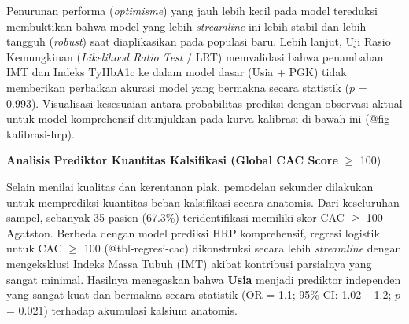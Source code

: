 \documentclass[
  indonesian,
]{agujournal2019}
\begin{document}
Penurunan performa (\emph{optimisme}) yang jauh lebih kecil pada model
tereduksi membuktikan bahwa model yang lebih \emph{streamline} ini lebih
stabil dan lebih tangguh (\emph{robust}) saat diaplikasikan pada
populasi baru. Lebih lanjut, Uji Rasio Kemungkinan (\emph{Likelihood
Ratio Test} / LRT) memvalidasi bahwa penambahan IMT dan Indeks TyHbA1c
ke dalam model dasar (Usia + PGK) tidak memberikan perbaikan akurasi
model yang bermakna secara statistik (\(p\) = 0.993). Visualisasi
kesesuaian antara probabilitas prediksi dengan observasi aktual untuk
model komprehensif ditunjukkan pada kurva kalibrasi di bawah ini
(@fig-kalibrasi-hrp).

\textbf{Analisis Prediktor Kuantitas Kalsifikasi (Global CAC Score}
\(\ge\) 100)

Selain menilai kualitas dan kerentanan plak, pemodelan sekunder
dilakukan untuk memprediksi kuantitas beban kalsifikasi secara anatomis.
Dari keseluruhan sampel, sebanyak 35 pasien (67.3\%) teridentifikasi
memiliki skor CAC \(\ge\) 100 Agatston. Berbeda dengan model prediksi
HRP komprehensif, regresi logistik untuk CAC \(\ge\) 100
(@tbl-regresi-cac) dikonstruksi secara lebih \emph{streamline} dengan
mengeksklusi Indeks Massa Tubuh (IMT) akibat kontribusi parsialnya yang
sangat minimal. Hasilnya menegaskan bahwa \textbf{Usia} menjadi
prediktor independen yang sangat kuat dan bermakna secara statistik (OR
= 1.1; 95\% CI: 1.02 -- 1.2; \(p\) = 0.021) terhadap akumulasi kalsium
anatomis.

\begin{table}

\caption{\label{tbl-regresi-cac}\textbf{Analisis Multivariat Prediktor
Kalsifikasi Koroner Moderat-Berat (CAC ≥ 100 Agatston)}}


\end{table}%
\end{document}
